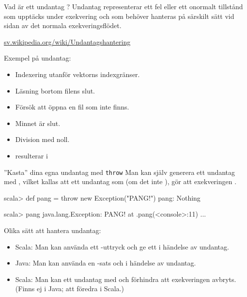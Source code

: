 


\ifkompendium\else

\begin{Slide}{Vad är ett undantag ?}
Undantag representerar ett fel eller ett onormalt tillstånd som upptäcks under exekvering och som  behöver hanteras på särskilt sätt vid sidan av det normala exekveringsflödet. 

\vspace{1em}\href{https://sv.wikipedia.org/wiki/Undantagshantering}{sv.wikipedia.org/wiki/Undantagshantering}


\vspace{1em} Exempel på undantag:

\pause

\begin{itemize}
\item Indexering utanför vektorns indexgränser.

\item Läsning bortom filens slut.

\item Försök att öppna en fil som inte finns.

\item Minnet är slut.

\item Division med noll.

\item {} resulterar i \\

\end{itemize}

\end{Slide}

\begin{Slide}{''Kasta'' dina egna undantag med \texttt{throw}}\SlideFontSmall
Man kan själv generera ett undantag med , vilket kallas att  ett undantag som (om det inte ), gör att exekveringen .


\begin{REPL}
scala> def pang = throw new Exception("PANG!")
pang: Nothing

scala> pang
java.lang.Exception: PANG!
  at .pang(<console>:11)
  ...
  
\end{REPL}
\pause
Olika sätt att hantera undantag: 
\begin{itemize}
\item Scala: Man kan använda ett -uttryck och ge ett  i händelse av undantag.
\item Java: Man kan använda en -sats och  i händelse av undantag.
 
\item Scala: Man kan  ett undantag med  och förhindra att exekveringen avbryts. (Finns ej i Java; att föredra i Scala.)
\end{itemize}
\end{Slide}


